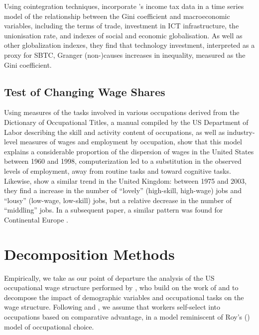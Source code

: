 Using cointegration techniques, \citet{Gaston2009} incorporate \citet{Leigh2005}'s income tax data in a time series model of the relationship between the Gini coefficient and macroeconomic variables, including the terms of trade, investment in ICT infrastructure, the unionisation rate, and indexes of social and economic globalisation. As well as other globalization indexes, they find that technology investment, interpreted as a proxy for SBTC, Granger (non-)causes increases in inequality, measured as the Gini coefficient.


\subsection{Test of Changing Wage Shares}



Using measures of the tasks involved in various occupations derived from the Dictionary of Occupational Titles, a manual compiled by the US Department of Labor describing the skill and activity content of occupations, as well as industry-level measures of wages and employment by occupation, \citet{Levy2003} show that this model explains a considerable proportion of the dispersion of wages in the United States between 1960 and 1998, computerization led to a substitution in the observed levels of employment, away from routine tasks and toward cognitive tasks. Likewise, \citet{Goos2007} show a similar trend in the United Kingdom: between 1975 and 2003, they find a increase in the number of ``lovely'' (high-skill, high-wage) jobs and ``lousy'' (low-wage, low-skill) jobs, but a relative decrease in the number of ``middling'' jobs. In a subsequent paper, a similar pattern was found for Continental Europe \citep{Goos2009}.


\section{Decomposition Methods}

Empirically, we take as our point of departure the analysis of the US occupational wage structure performed by \citet{Fortin2011}, who build on the work of \citet{Oaxaca1973} and \citet{Juhn1993} to decompose the impact of demographic variables and occupational tasks on the wage structure. Following \citet{Autor2012} and \citet{Fortin2011}, we assume that workers self-select into occupations based on comparative advantage, in a model reminiscent of Roy's (\citeyear{Roy1951}) model of occupational choice.

